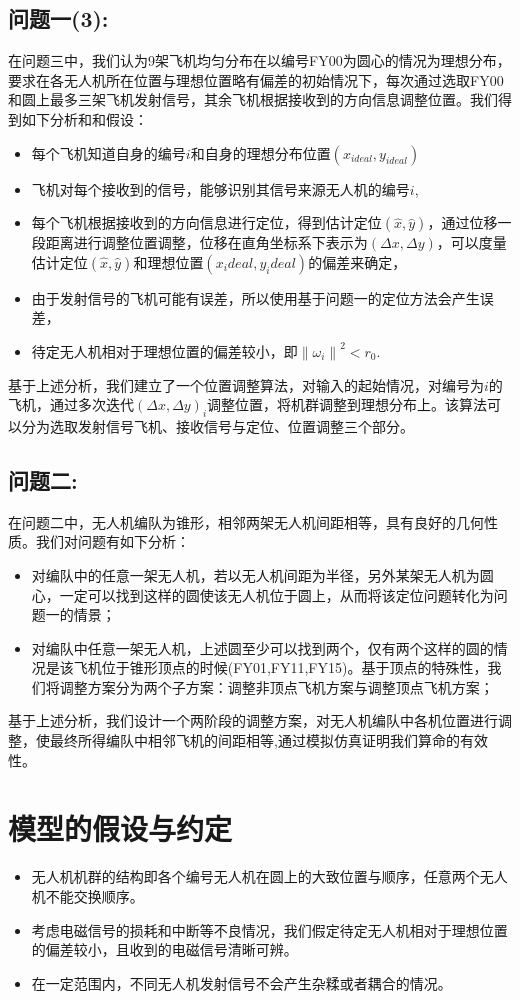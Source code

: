 \documentclass[withoutpreface,bwprint]{cumcmthesis} %
\begin{document}
		\subsection{问题一(3):}
		在问题三中，我们认为9架飞机均匀分布在以编号FY00为圆心的情况为理想分布，要求在各无人机所在位置与理想位置略有偏差的初始情况下，每次通过选取FY00和圆上最多三架飞机发射信号，其余飞机根据接收到的方向信息调整位置。我们得到如下分析和和假设：
		\begin{itemize}
			\item	每个飞机知道自身的编号$i$和自身的理想分布位置$(x_{ideal},y_{ideal})$
			\item   飞机对每个接收到的信号，能够识别其信号来源无人机的编号$i$,
			\item	每个飞机根据接收到的方向信息进行定位，得到估计定位$(\hat{x},\hat{y})$，通过位移一段距离进行调整位置调整，位移在直角坐标系下表示为$(\Delta{}x,\Delta{}y)$，可以度量估计定位$(\hat{x},\hat{y})$和理想位置$(x_ideal,y_ideal)$的偏差来确定，
			\item	由于发射信号的飞机可能有误差，所以使用基于问题一的定位方法会产生误差，
			\item 	待定无人机相对于理想位置的偏差较小，即$ {\lVert \omega_i \rVert}^2 < r_0 $.
		\end{itemize}
		基于上述分析，我们建立了一个位置调整算法，对输入的起始情况，对编号为$i$的飞机，通过多次迭代$(\Delta{}x,\Delta{}y)_i$调整位置，将机群调整到理想分布上。该算法可以分为选取发射信号飞机、接收信号与定位、位置调整三个部分。
		\subsection{问题二:}
		 在问题二中，无人机编队为锥形，相邻两架无人机间距相等，具有良好的几何性质。我们对问题有如下分析：
		\begin{itemize}
			\item 对编队中的任意一架无人机，若以无人机间距为半径，另外某架无人机为圆心，一定可以找到这样的圆使该无人机位于圆上，从而将该定位问题转化为问题一的情景；
			\item 对编队中任意一架无人机，上述圆至少可以找到两个，仅有两个这样的圆的情况是该飞机位于锥形顶点的时候(FY01,FY11,FY15)。基于顶点的特殊性，我们将调整方案分为两个子方案：调整非顶点飞机方案与调整顶点飞机方案；
		\end{itemize}
		基于上述分析，我们设计一个两阶段的调整方案，对无人机编队中各机位置进行调整，使最终所得编队中相邻飞机的间距相等,通过模拟仿真证明我们算命的有效性。
	\section{模型的假设与约定}
		\begin{itemize}
			\item{} 无人机机群的结构即各个编号无人机在圆上的大致位置与顺序，任意两个无人机不能交换顺序。
			\item{} 考虑电磁信号的损耗和中断等不良情况，我们假定待定无人机相对于理想位置的偏差较小，且收到的电磁信号清晰可辨。
			\item{} 在一定范围内，不同无人机发射信号不会产生杂糅或者耦合的情况。
			
		\end{itemize}
\end{document}
